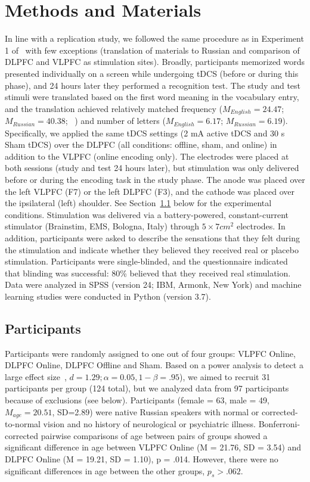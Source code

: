\documentclass[10pt,letterpaper]{article}
\begin{document}
\section{Methods and Materials}

In line with a replication study, we followed the same procedure as in Experiment 1 of~\cite{medvedeva2019effects} with few exceptions (translation of materials to Russian and comparison of DLPFC and VLPFC as stimulation sites). Broadly, participants memorized words presented individually on a screen while undergoing tDCS (before or during this phase), and 24 hours later they performed a recognition test. The study and test stimuli were translated based on the first word meaning in the vocabulary entry, and the translation achieved relatively matched frequency (\(M_{English} = 24.47\); \(M_{Russian}=40.38\); ~\cite{lyashevskaya2009frequency}) and number of letters (\(M_{English}=6.17\); \(M_{Russian}=6.19\)). Specifically, we applied the same tDCS settings (2 mA active tDCS and 30 s Sham tDCS) over the DLPFC (all conditions: offline, sham, and online) in addition to the VLPFC (online encoding only). 
The electrodes were placed at both sessions (study and test 24 hours later), but stimulation was only
delivered before or during the encoding task in the study phase. The anode was placed over the left
VLPFC (F7) or the left DLPFC (F3), and the cathode was placed over the ipsilateral (left) shoulder. See
Section~\ref{ss:participants} below for the experimental conditions.
Stimulation was delivered via a battery-powered, constant-current stimulator (Brainstim, EMS, Bologna, Italy) through \(5 \times 7 cm^2\) electrodes. In addition, participants were asked to describe the sensations that they felt during the stimulation and indicate whether they believed they received real or placebo stimulation. Participants were single-blinded, and the questionnaire indicated that blinding was successful: 80\% believed that they received real stimulation. Data were analyzed in SPSS (version 24; IBM, Armonk, New York) and machine learning studies were conducted in Python (version 3.7).

\subsection{Participants}
\label{ss:participants}
Participants were randomly assigned to one out of four groups: VLPFC Online, DLPFC Online, DLPFC Offline and Sham. Based on a power analysis to detect a large effect size~\cite{medvedeva2019effects}, \( d = 1.29; \alpha = 0.05, 1-\beta = .95\)), we aimed to recruit 31 participants per group (124 total), but we analyzed data from 97 participants because of exclusions (see below). Participants (female = 63, male = 49, \(M_{age} = 20.51\), SD=2.89) were native Russian speakers with normal or corrected-to-normal vision and no history of neurological or psychiatric illness. Bonferroni-corrected pairwise comparisons of age between pairs of groups showed a significant difference in age between VLPFC Online (M = 21.76, SD = 3.54) and DLPFC Online (M = 19.21, SD = 1.10), p = .014. However, there were no significant differences in age between the other groups, \(p_s>.062\). 
\end{document}
